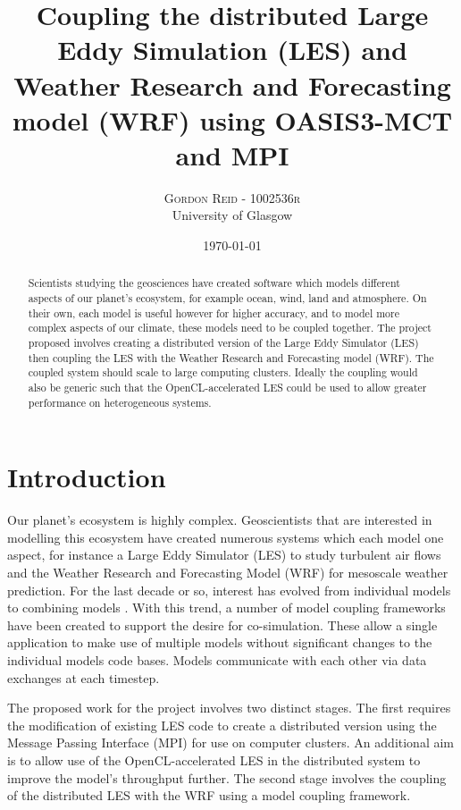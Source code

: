 \documentclass[a4paper,twocolumn,10pt]{article}
\title{Coupling the distributed Large Eddy Simulation (LES) and Weather
Research and Forecasting model (WRF) using OASIS3-MCT and MPI}
\author{\large\textsc{Gordon Reid - 1002536r}\\University of Glasgow}
\date{\today}
\begin{document}
\setlength{\parskip}{0.3cm}

\maketitle

\begin{abstract}

\noindent Scientists studying the geosciences have created software which models
different aspects of our planet's ecosystem, for example ocean, wind, land and
atmosphere. On their own, each model is useful however for higher accuracy, and
to model more complex aspects of our climate, these models need to be coupled
together. The project proposed involves creating a distributed version of the
Large Eddy Simulator (LES) then coupling the LES with the Weather Research and
Forecasting model (WRF). The coupled system should scale to large computing
clusters. Ideally the coupling would also be generic such that the
OpenCL-accelerated LES could be used to allow greater performance on
heterogeneous systems.

\end{abstract}

\section*{Introduction}

Our planet's ecosystem is highly complex. Geoscientists that are interested in
modelling this ecosystem have created numerous systems which each model one
aspect, for instance a Large Eddy Simulator (LES) to study turbulent air flows
\cite{Nakayama2011,Nakayama2012} and the Weather Research and Forecasting Model
(WRF) for mesoscale weather prediction. For the last decade or so, interest has
evolved from individual models to combining models \cite{Michalakes2010}. With
this trend, a number of model coupling frameworks have been created to support
the desire for co-simulation. These allow a single application to make use of
multiple models without significant changes to the individual models code bases.
Models communicate with each other via data exchanges at each timestep.

The proposed work for the project involves two distinct stages. The first
requires the modification of existing LES code to create a distributed version
using the Message Passing Interface (MPI) for use on computer clusters. An
additional aim is to allow use of the OpenCL-accelerated LES
\cite{Vanderbauwhede2014} in the distributed system to improve the model's
throughput further. The second stage involves the coupling of the distributed
LES with the WRF using a model coupling framework.
\end{document}

